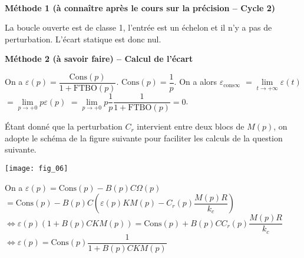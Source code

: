 \begin{multicols}{2}

\ifprof
\begin{corrige}~\\
\textbf{Méthode 1 (à connaître après le cours sur la précision -- Cycle 2)}

La boucle ouverte est de classe 1, l'entrée est un échelon et il n'y a pas de perturbation. L'écart statique est donc nul.


\textbf{Méthode 2 (à savoir faire) -- Calcul de l'écart}

On a $\varepsilon(p)=\dfrac{\text{Cons}(p)}{1+\text{FTBO}(p)}$. $\text{Cons}(p)=\dfrac{1}{p}$.
On a alors 
$\varepsilon_{\text{cons} \infty} $
$= \lim\limits_{t\to+\infty} \varepsilon(t)$ 
$ = \lim\limits_{p\to+0} p\varepsilon(p)$ 
$ = \lim\limits_{p\to+0} p\dfrac{1}{p}\dfrac{1}{1+\text{FTBO}(p)}=0$.
 



\end{corrige}
\else
\fi

\ifprof
\else
Étant donné que la perturbation $C_r$ intervient entre deux blocs de $M(p)$, on adopte le schéma de la 
figure suivante pour faciliter les calculs de la question suivante. 

\begin{center}
\texttt{[image: fig\_06]}
\end{center}

\fi


\ifprof
\newpage
\else
\fi

\ifprof
\begin{corrige}
On  a $\varepsilon(p)=\text{Cons}(p)-B(p)C\Omega(p)$ $=\text{Cons}(p)-B(p)C\left( \varepsilon(p) K M(p)- C_r(p) \dfrac{M(p)R}{k_c} \right)$ $ \Leftrightarrow \varepsilon(p) \left(1+ B(p)C  K M(p)\right)=\text{Cons}(p) +B(p)C C_r(p) \dfrac{M(p)R}{k_c}  $
$ \Leftrightarrow \varepsilon(p) =\text{Cons}(p)\dfrac{1}{1+ B(p)C  K M(p)}  $


\end{corrige}
\end{multicols}
